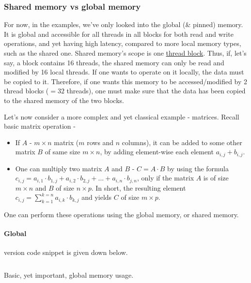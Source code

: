 \subsubsection{Shared memory vs global memory}

For now, in the examples, we've only looked into the global (\& pinned) memory. It is global and accessible 
for all threads in all blocks for both read and write operations, and yet having high latency, compared to 
more local memory types, such as the shared one. Shared memory's scope is one \underline{thread block}. Thus, if, let's say,
a block contains 16 threads, the shared memory can only be read and modified by 16 local threads. If one wants to operate on it 
locally, the data must be copied to it. Therefore, if one wants this memory to be accessed/modified by 2 thread blocks ($=32$ threads), one 
must make sure that the data has been copied to the shared memory of the two blocks.

Let's now consider a more complex and yet classical example - matrices. Recall basic matrix operation - 
\begin{itemize}
   \setlength\itemsep{-0.5em}
   \item If $A$ - $m\times n$ matrix ($m$ rows and $n$ columns), it can be added to some 
   other matrix $B$ of same size $m\times n$, by adding element-wise each element $a_{i,j}+b_{i,j}$. 
   \item One can multiply two matrix $A$ and $B$ - $C = A\cdot B$ by using the formula 
   $c_{i,j} = a_{i,1}\cdot b_{1,j} + a_{i,2}\cdot b_{2,j} + ... + a_{i, n}\cdot b_{j,n}$, only if the matrix 
   $A$ is of size $m\times n$ and $B$ of size $n\times p$. In short, the resulting 
   element $c_{i,j} = \sum_{k=1}^{k=n}a_{i,k}\cdot b_{k,j}$ and yields $C$ of size $m\times p$.
\end{itemize}

One can perform these operations using the global memory, or shared memory.

\paragraph{Global} version code snippet is given down below.


\begin{listing}
\inputminted[linenos=true, frame=single]{cuda}{cucodes/matmulglob.cu}
    \caption{Basic, yet important, global memory usage. \cite{tuomanen2018hands}}
\end{listing}

